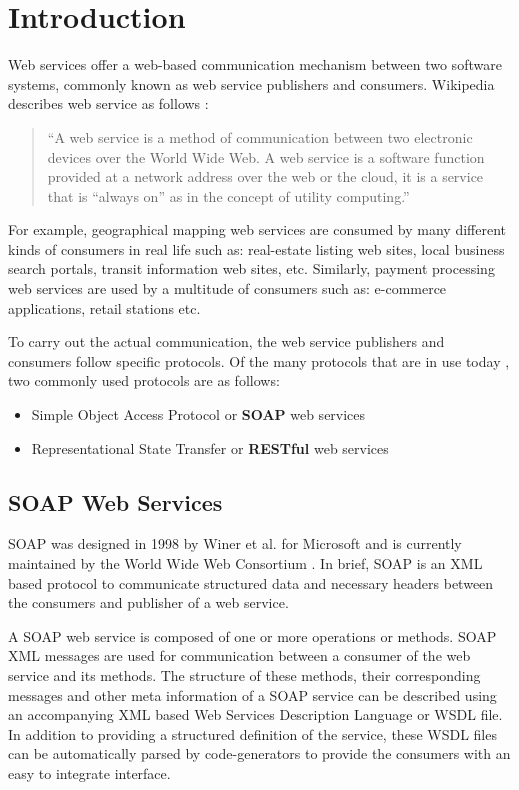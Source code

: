 \documentclass[runningheads,a4paper]{llncs}
\begin{document}
\section{Introduction}

Web services offer a web-based communication mechanism between two software systems, commonly known as web service publishers and consumers. Wikipedia describes web service as follows \cite{web_service_wiki}:

\begin{quote}
``A web service is a method of communication between two electronic devices over the World Wide Web. A web service is a software function provided at a network address over the web or the cloud, it is a service that is ``always on'' as in the concept of utility computing.''
\end{quote}

For example, geographical mapping web services are consumed by many different kinds of consumers in real life such as: real-estate listing web sites, local business search portals, transit information web sites, etc. Similarly, payment processing web services are used by a multitude of consumers such as: e-commerce applications, retail stations etc.

To carry out the actual communication, the web service publishers and consumers follow specific protocols. Of the many protocols that are in use today \cite{web_service_protocols_wiki}, two commonly used protocols are as follows:

\begin{itemize}
  \item Simple Object Access Protocol or \textbf{SOAP} web services
  \item Representational State Transfer or \textbf{RESTful} web services
\end{itemize}


\subsection{SOAP Web Services} %
\label{sub:soap_web_services}
SOAP was designed in 1998 by Winer et al. for Microsoft and is currently maintained by the World Wide Web Consortium \cite{soap_wiki}. In brief, SOAP is an XML based protocol to communicate structured data and necessary headers between the consumers and publisher of a web service.

A SOAP web service is composed of one or more operations or methods. SOAP XML messages are used for communication between a consumer of the web service and its methods. The structure of these methods, their corresponding messages and other meta information of a SOAP service can be described using an accompanying XML based Web Services Description Language or WSDL file. In addition to providing a structured definition of the service, these WSDL files can be automatically parsed by code-generators to provide the consumers with an easy to integrate interface.
\end{document}

